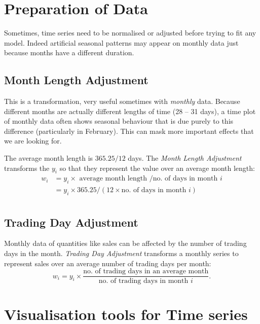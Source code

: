 \documentclass[a4paper,11pt,oneside,onecolumn]{book}
\begin{document}
\chapter{Preparation of Data}



Sometimes, time series need to be normalised or adjusted before trying  to fit any model.
Indeed artificial seasonal patterns may appear on monthly data just because months have a different duration.


\section{Month Length Adjustment}
This is a transformation, very useful sometimes with {\it
monthly} data. Because different months are actually different
lengths of time (28 -- 31 days), a time plot of monthly data often
shows seasonal behaviour that is due purely to this difference
(particularly in February). This can mask more important effects
that we are looking for.

The average month length is $365.25/12$ days. The {\it Month
Length Adjustment} transforms the $y_i$ so that they represent the
value over an average month length:
\[
\begin{array}{ll} 
w_i &= y_i \times \mbox{ average month length }/\mbox{no.\ of
days in month $i$} \\
&= y_i \times 365.25/(12 \times \mbox{no.\ of
days in month $i$})\\
\end{array}
 \]



\section{Trading Day Adjustment}

Monthly data of quantities like sales can be affected by the
number of trading days in the month.  {\it Trading Day
Adjustment} transforms a monthly series to represent sales over an
average number of trading days per month:
\[ 
w_i = y_i \times \frac{\text{no. of trading days in an average month} }{\text{no. of
trading days in month $i$}}. \]



\chapter{Visualisation tools for Time series}
\end{document}
